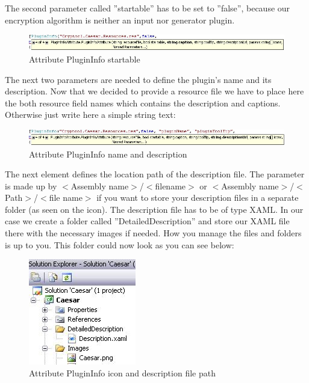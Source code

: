 The second parameter called ''startable'' has to be set to ''false'', because our encryption algorithm is neither an input nor generator plugin.
\begin{figure}[h!]
	\centering
		\includegraphics[width=1.00\textwidth]{figures/attribute_plugininfo_startable.jpg}
	\caption{Attribute PluginInfo startable}
	\label{fig:attribute_plugininfo_startable}
\end{figure}

The next two parameters are needed to define the plugin's name and its description. Now that we decided to provide a resource file we have to place here the both resource field names which contains the description and captions. Otherwise just write here a simple string text:
\begin{figure}[h!]
	\centering
		\includegraphics[width=1.00\textwidth]{figures/attribute_plugininfo_description.jpg}
	\caption{Attribute PluginInfo name and description}
	\label{fig:attribute_plugininfo_description}
\end{figure}

The next element defines the location path of the description file. The parameter is made up by $<$Assembly name$>$/$<$filename$>$ or $<$Assembly name$>$/$<$Path$>$/$<$file name$>$ if you want to store your description files in a separate folder (as seen on the icon). The description file has to be of type XAML. In our case we create a folder called ''DetailedDescription'' and store our XAML file there with the necessary images if needed. How you manage the files and folders is up to you. This folder could now look as you can see below:
\begin{figure}[h!]
	\centering
		\includegraphics{figures/attribute_plugininfo_detailed_descr_path.jpg}
	\caption{Attribute PluginInfo icon and description file path}
	\label{fig:attribute_plugininfo_icon_path}
\end{figure}

